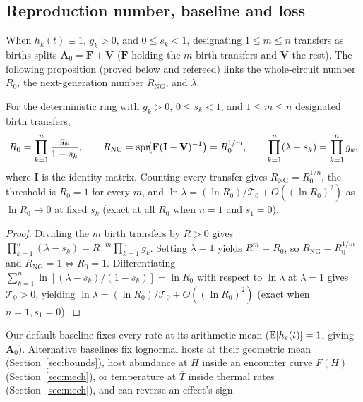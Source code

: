 \subsection{Reproduction number, baseline and loss}\label{sec:model-r0}

When $h_k(t) \equiv 1$, $g_k > 0$, and $0 \le s_k < 1$, designating $1 \le m \le n$ transfers as births splits $\mathbf{A}_0 = \mathbf{F} + \mathbf{V}$ ($\mathbf{F}$ holding the $m$ birth transfers and $\mathbf{V}$ the rest). The following proposition (proved below and refereed) links the whole-circuit number $R_0$, the next-generation number $R_{\mathrm{NG}}$, and $\lambda$.

\begin{proposition}\label{prop:model-birth}
For the deterministic ring with $g_k > 0$, $0 \le s_k < 1$, and $1 \le m \le n$ designated birth transfers,
\begin{equation}\label{eq:model-r0}
R_0 = \prod_{k=1}^n \frac{g_k}{1 - s_k}, \qquad R_{\mathrm{NG}} = \operatorname{spr}\!\bigl(\mathbf{F}(\mathbf{I} - \mathbf{V})^{-1}\bigr) = R_0^{1/m}, \qquad \prod_{k=1}^n (\lambda - s_k) = \prod_{k=1}^n g_k,
\end{equation}
where $\mathbf{I}$ is the identity matrix. Counting every transfer gives $R_{\mathrm{NG}} = R_0^{1/n}$, the threshold is $R_0 = 1$ for every $m$, and $\ln\lambda = (\ln R_0)/\mathcal{T}_0 + O((\ln R_0)^2)$ as $\ln R_0 \to 0$ at fixed $s_k$ (exact at all $R_0$ when $n = 1$ and $s_1 = 0$).
\end{proposition}

\begin{proof}
Dividing the $m$ birth transfers by $R > 0$ gives $\prod_{k=1}^n (\lambda - s_k) = R^{-m}\prod_{k=1}^n g_k$. Setting $\lambda = 1$ yields $R^m = R_0$, so $R_{\mathrm{NG}} = R_0^{1/m}$ and $R_{\mathrm{NG}} = 1 \iff R_0 = 1$. Differentiating $\sum_{k=1}^n \ln[(\lambda - s_k)/(1 - s_k)] = \ln R_0$ with respect to $\ln\lambda$ at $\lambda = 1$ gives $\mathcal{T}_0 > 0$, yielding $\ln\lambda = (\ln R_0)/\mathcal{T}_0 + O((\ln R_0)^2)$ (exact when $n = 1, s_1 = 0$).
\end{proof}

Our default baseline fixes every rate at its arithmetic mean ($\mathbb{E}[h_e(t)] = 1$, giving $\mathbf{A}_0$). Alternative baselines fix lognormal hosts at their geometric mean (Section~\ref{sec:bounds}), host abundance at $\overline{H}$ inside an encounter curve $F(H)$ (Section~\ref{sec:mech}), or temperature at $\overline{T}$ inside thermal rates (Section~\ref{sec:mech}), and can reverse an effect's sign.

